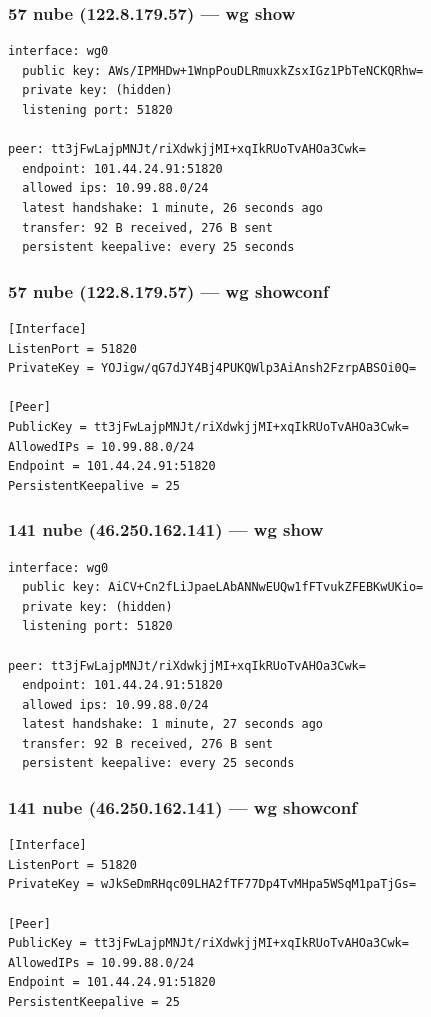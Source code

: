 \documentclass[11pt,a4paper]{article}
\begin{document}
\subsubsection*{57 nube (122.8.179.57) — wg show}
\begin{lstlisting}
interface: wg0
  public key: AWs/IPMHDw+1WnpPouDLRmuxkZsxIGz1PbTeNCKQRhw=
  private key: (hidden)
  listening port: 51820

peer: tt3jFwLajpMNJt/riXdwkjjMI+xqIkRUoTvAHOa3Cwk=
  endpoint: 101.44.24.91:51820
  allowed ips: 10.99.88.0/24
  latest handshake: 1 minute, 26 seconds ago
  transfer: 92 B received, 276 B sent
  persistent keepalive: every 25 seconds

\end{lstlisting}

\subsubsection*{57 nube (122.8.179.57) — wg showconf}
\begin{lstlisting}
[Interface]
ListenPort = 51820
PrivateKey = YOJigw/qG7dJY4Bj4PUKQWlp3AiAnsh2FzrpABSOi0Q=

[Peer]
PublicKey = tt3jFwLajpMNJt/riXdwkjjMI+xqIkRUoTvAHOa3Cwk=
AllowedIPs = 10.99.88.0/24
Endpoint = 101.44.24.91:51820
PersistentKeepalive = 25

\end{lstlisting}

\subsubsection*{141 nube (46.250.162.141) — wg show}
\begin{lstlisting}
interface: wg0
  public key: AiCV+Cn2fLiJpaeLAbANNwEUQw1fFTvukZFEBKwUKio=
  private key: (hidden)
  listening port: 51820

peer: tt3jFwLajpMNJt/riXdwkjjMI+xqIkRUoTvAHOa3Cwk=
  endpoint: 101.44.24.91:51820
  allowed ips: 10.99.88.0/24
  latest handshake: 1 minute, 27 seconds ago
  transfer: 92 B received, 276 B sent
  persistent keepalive: every 25 seconds

\end{lstlisting}

\subsubsection*{141 nube (46.250.162.141) — wg showconf}
\begin{lstlisting}
[Interface]
ListenPort = 51820
PrivateKey = wJkSeDmRHqc09LHA2fTF77Dp4TvMHpa5WSqM1paTjGs=

[Peer]
PublicKey = tt3jFwLajpMNJt/riXdwkjjMI+xqIkRUoTvAHOa3Cwk=
AllowedIPs = 10.99.88.0/24
Endpoint = 101.44.24.91:51820
PersistentKeepalive = 25

\end{lstlisting}
\end{document}
